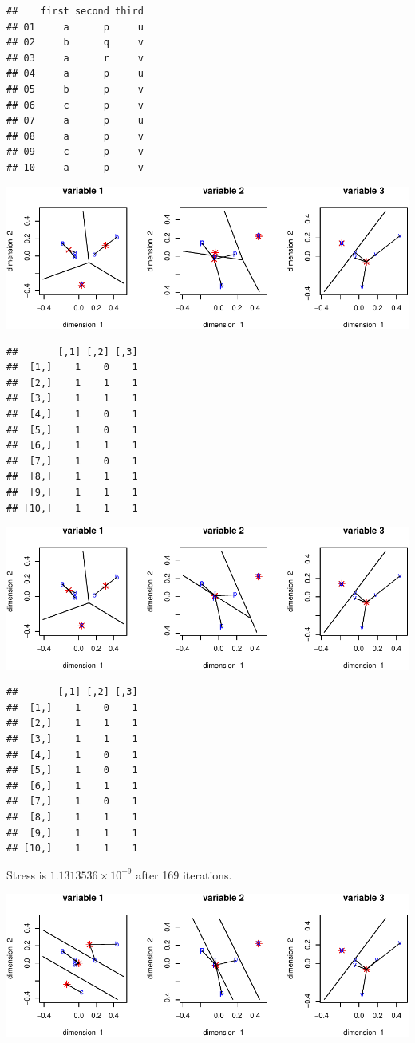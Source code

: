 \documentclass[
  12pt,
]{article}
\begin{document}
\begin{verbatim}
##    first second third
## 01     a      p     u
## 02     b      q     v
## 03     a      r     v
## 04     a      p     u
## 05     b      p     v
## 06     c      p     v
## 07     a      p     u
## 08     a      p     v
## 09     c      p     v
## 10     a      p     v
\end{verbatim}

\includegraphics{smacofHO_files/figure-latex/smallhomals-1.pdf}

\begin{verbatim}
##       [,1] [,2] [,3]
##  [1,]    1    0    1
##  [2,]    1    1    1
##  [3,]    1    1    1
##  [4,]    1    0    1
##  [5,]    1    0    1
##  [6,]    1    1    1
##  [7,]    1    0    1
##  [8,]    1    1    1
##  [9,]    1    1    1
## [10,]    1    1    1
\end{verbatim}

\includegraphics{smacofHO_files/figure-latex/small00-1.pdf}

\begin{verbatim}
##       [,1] [,2] [,3]
##  [1,]    1    0    1
##  [2,]    1    1    1
##  [3,]    1    1    1
##  [4,]    1    0    1
##  [5,]    1    0    1
##  [6,]    1    1    1
##  [7,]    1    0    1
##  [8,]    1    1    1
##  [9,]    1    1    1
## [10,]    1    1    1
\end{verbatim}

Stress is \ensuremath{1.1313536\times 10^{-9}} after 169 iterations.

\begin{center}\includegraphics{smacofHO_files/figure-latex/small10-1} \end{center}
\end{document}
